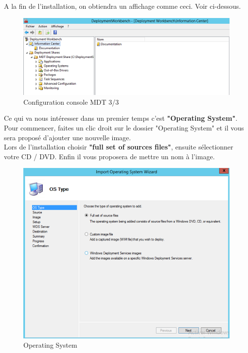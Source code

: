\documentclass[11pt,a4paper,oneside]{article}
\begin{document}
\newpage
A la fin de l'installation, on obtiendra un affichage comme ceci. Voir ci-dessous.
\begin{figure}[hbtp]
\centering
\includegraphics[scale=0.7]{Pictures/MDT/MDT5.png}
\caption{\label{etiquette} Configuration console MDT 3/3}
\end{figure}

Ce qui va nous intéresser dans un premier temps c'est \textbf{"Operating System"}. Pour commencer, faites un clic droit sur le dossier "Operating System" et il vous sera proposé d'ajouter une nouvelle image.\\
Lors de l'installation choisir \textbf{"full set of sources files"}, ensuite sélectionner votre CD / DVD. Enfin il vous proposera de mettre un nom à l'image.
\begin{figure}[hbtp]
\centering
\includegraphics[scale=0.7]{Pictures/MDT/MDT6.png}
\caption{\label{etiquette} Operating System}
\end{figure}
\end{document}
